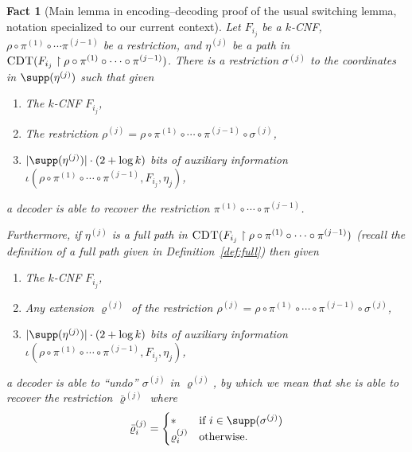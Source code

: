 \documentclass[11pt]{article}
\numberwithin{equation}{section}
\newtheorem{fact}[theorem]{Fact}
\theoremstyle{definition}
\theoremstyle{plain}
\theoremstyle{plain}
\newcommand{\uhr}{\upharpoonright}
\newcommand{\CDT}{\textsc{CDT}}
\begin{document}
\begin{fact}[Main lemma in encoding--decoding proof of the usual switching lemma, notation specialized to our current context]
\label{fact:raz} 
Let $F_{i_j}$ be a $k$-CNF, $\rho \circ \pi^{(1)}\circ\cdots \pi^{(j-1)}$ be a restriction, and $\eta^{(j)}$ be  a path in $\CDT(F_{i_j}\uhr \rho\circ \pi^{(1)} \circ \cdots \circ \pi^{(j-1)})$.  There is a restriction $\sigma^{(j)}$ to the coordinates in $\supp(\eta^{(j)})$ such that given 
\begin{enumerate}
\item The $k$-CNF $F_{i_j}$, 
\item The restriction $\rho^{(j)} = \rho \circ \pi^{(1)} \circ \cdots \circ \pi^{(j-1)} \circ \sigma^{(j)}$, 
\item $|\supp(\eta^{(j)})|\cdot (2 + \log k)$ bits of auxiliary information $\iota(\rho \circ \pi^{(1)}\circ\cdots \circ\pi^{(j-1)}, F_{i_j},\eta_j)$,
\end{enumerate} 
a decoder is able to recover the restriction $\pi^{(1)} \circ \cdots \circ \pi^{(j-1)}$. 

Furthermore, if $\eta^{(j)}$ is a \emph{full} path in $\CDT(F_{i_j}\uhr \rho\circ \pi^{(1)} \circ \cdots \circ \pi^{(j-1)})$ (recall the definition of a full path given in Definition~\ref{def:full}) then given 
\begin{enumerate}
\item The $k$-CNF $F_{i_j}$, 
\item \emph{Any extension $\varrho^{(j)}$ of} the restriction $\rho^{(j)} = \rho \circ \pi^{(1)} \circ \cdots \circ \pi^{(j-1)} \circ \sigma^{(j)}$, 
\item $|\supp(\eta^{(j)})|\cdot (2 + \log k)$ bits of auxiliary information $\iota(\rho \circ \pi^{(1)}\circ\cdots \circ\pi^{(j-1)}, F_{i_j},\eta_j)$,\end{enumerate}
a decoder is able to ``undo'' $\sigma^{(j)}$ in $\varrho^{(j)}$, by which we mean that she is able to recover the restriction $\bar{\varrho}^{(j)}$ where 
\[ 
\bar{\varrho}^{(j)}_i = \begin{cases} 
\ast & \text{if $i\in \supp(\sigma^{(j)})$} \\
\varrho^{(j)}_i & \text{otherwise.} 
\end{cases} 
\] 
\end{fact} 
\end{document}
